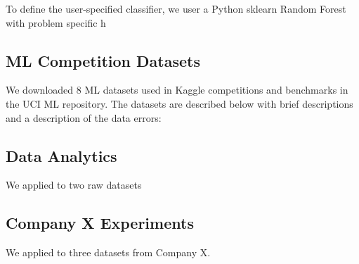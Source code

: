 To define the user-specified classifier, we user a Python \textsf{sklearn} Random Forest with problem specific h

\subsection{ML Competition Datasets}
We downloaded 8 ML datasets used in Kaggle competitions and benchmarks in the UCI ML repository. The datasets are described below with brief descriptions and a description of the data errors:


\subsection{Data Analytics}
We applied \sys to two raw datasets


\subsection{Company X Experiments}
We applied \sys to three datasets from Company X.




